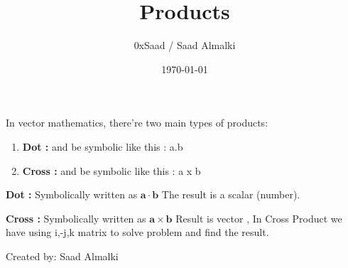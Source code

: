 \documentclass[12pt]{article}
\title{Products}
\author{0xSaad / Saad Almalki}
\date{\today}
\begin{document}
\maketitle


In vector mathematics, there're two main types of products:
\begin{enumerate}[label=\arabic*.]
    \item \textbf{Dot :} and be symbolic like this : a.b
    \item \textbf{Cross :} and be symbolic like this : a x b
\end{enumerate}

\item \textbf{Dot :} Symbolically written as $ \mathbf{a} \cdot \mathbf{b} $
The result is a scalar (number).

\item \textbf{Cross :} Symbolically written as $ \mathbf{a} \times \mathbf{b} $
Result is vector , In Cross Product we have using i,-j,k matrix to solve problem and find the result.

\begin{flushright}
Created by: Saad Almalki \\
\end{flushright}
\end{document}
